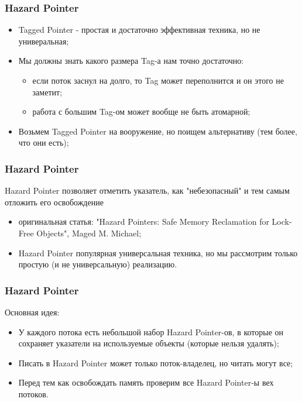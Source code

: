 \begin{frame}
\frametitle{Hazard Pointer}

\begin{itemize}
  \item Tagged Pointer - простая и достаточно эффективная техника, но не универальная;
  \item Мы должны знать какого размера Tag-а нам точно достаточно:
    \begin{itemize}
      \item если поток заснул на долго, то Tag может переполнится и он этого не заметит;
      \item работа с большим Tag-ом может вообще не быть атомарной;
    \end{itemize}
  \item Возьмем Tagged Pointer на вооружение, но поищем альтернативу (тем более, что они есть);
\end{itemize}
\end{frame}

\begin{frame}
\frametitle{Hazard Pointer}

Hazard Pointer позволяет отметить указатель, как "небезопасный" и тем самым отложить его освобождение
\begin{itemize}
  \item оригинальная статья: "Hazard Pointers: Safe Memory Reclamation for Lock-Free Objects", Maged M. Michael;
  \item Hazard Pointer популярная универсальная техника, но мы рассмотрим только простую (и не универсальную) реализацию.
\end{itemize}
\end{frame}

\begin{frame}
\frametitle{Hazard Pointer}

Основная идея:
\begin{itemize}
  \item У каждого потока есть небольшой набор Hazard Pointer-ов, в которые он сохраняет указатели на используемые объекты (которые нельзя удалять);
  \item Писать в Hazard Pointer может только поток-владелец, но читать могут все;
  \item Перед тем как освобождать память проверим все Hazard Pointer-ы вех потоков.
\end{itemize}
\end{frame}

